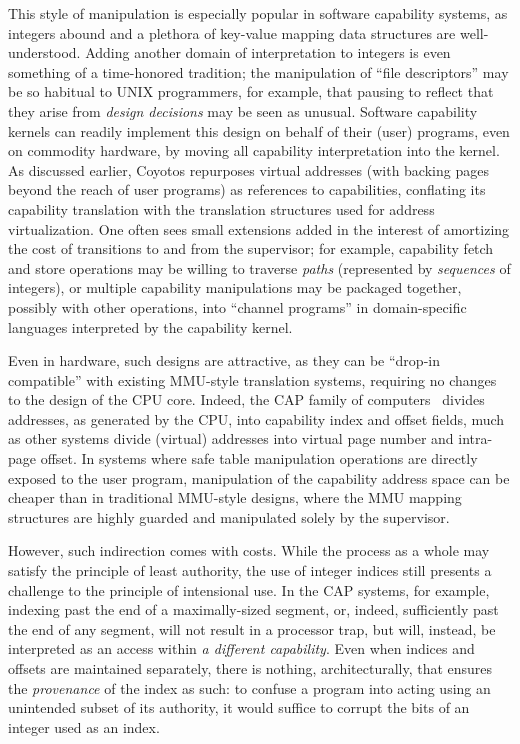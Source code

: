 This style of manipulation is especially popular in software capability
systems, as integers abound and a plethora of key-value mapping data structures
are well-understood.  Adding another domain of interpretation to integers is
even something of a time-honored tradition; the manipulation of ``file
descriptors'' may be so habitual to UNIX programmers, for example, that pausing
to reflect that they arise from \emph{design decisions} may be seen as unusual.
Software capability kernels can readily implement this design on behalf of
their (user) programs, even on commodity hardware, by moving all capability
interpretation into the kernel.  As discussed earlier, Coyotos repurposes
virtual addresses (with backing pages beyond the reach of user programs) as
references to capabilities, conflating its capability translation with the
translation structures used for address virtualization.  One often sees small
extensions added in the interest of amortizing the cost of transitions to and
from the supervisor; for example, capability fetch and store operations may be
willing to traverse \emph{paths} (represented by \emph{sequences} of integers),
or multiple capability manipulations may be packaged together, possibly with
other operations, into ``channel programs'' in domain-specific languages
interpreted by the capability kernel.

Even in hardware, such designs are attractive, as they can be ``drop-in
compatible'' with existing MMU-style translation systems, requiring no changes
to the design of the CPU core.  Indeed, the CAP family of
computers~\cite{WilkesNeedham79} divides addresses, as generated by the CPU,
into capability index and offset fields, much as other systems divide (virtual)
addresses into virtual page number and intra-page offset.  In systems where
safe table manipulation operations are directly exposed to the user program,
manipulation of the capability address space can be cheaper than in traditional
MMU-style designs, where the MMU mapping structures are highly guarded and
manipulated solely by the supervisor.
%

However, such indirection comes with costs.  While the process as a whole may
satisfy the principle of least authority, the use of integer indices still
presents a challenge to the principle of intensional use.  In the CAP systems,
for example, indexing past the end of a maximally-sized segment, or, indeed,
sufficiently past the end of any segment, will not result in a processor trap,
but will, instead, be interpreted as an access within \emph{a different
capability}.  Even when indices and offsets are maintained separately, there is
nothing, architecturally, that ensures the \emph{provenance} of the index as
such: to confuse a program into acting using an unintended subset of its
authority, it would suffice to corrupt the bits of an integer used as an index.

